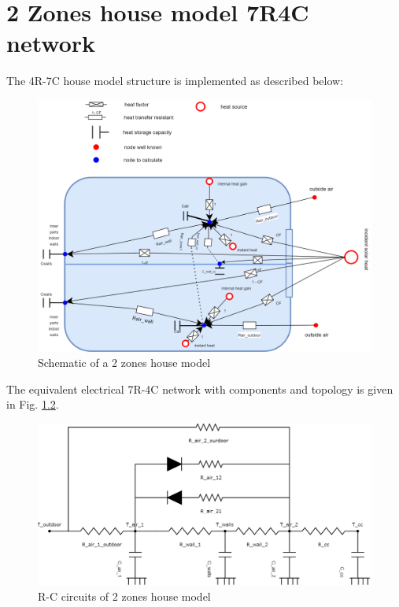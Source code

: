 \chapter{2 Zones house model 7R4C network}

The 4R-7C house model structure is implemented as described below:
	
\begin{figure}[H]
	\centering
	\includegraphics[width=1.0\columnwidth]{Pictures/House_electrical_circuits overview.png}
	\caption[Short title]{Schematic of a 2 zones house model}
	\label{fig:schema7R4C}
	\end{figure} 
	
The equivalent electrical 7R-4C network with components and topology is given in Fig. \ref{fig:elec7R4C}.

\begin{figure}[H]
	\centering
	\includegraphics[width=1.0\columnwidth]{Pictures/2_Zones_house_circuits.png}
	\caption[Short title]{R-C circuits of 2 zones house model}
	\label{fig:elec7R4C}
	\end{figure}

